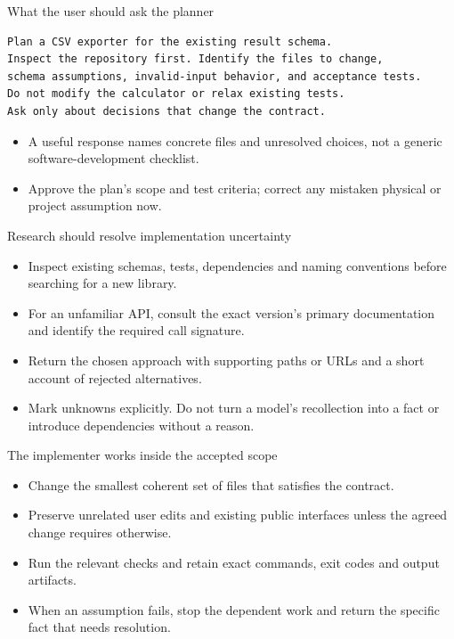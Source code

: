 \documentclass[aspectratio=169,11pt]{beamer}
\begin{document}
\begin{frame}[t,fragile]{What the user should ask the planner}
\begin{lstlisting}
Plan a CSV exporter for the existing result schema.
Inspect the repository first. Identify the files to change,
schema assumptions, invalid-input behavior, and acceptance tests.
Do not modify the calculator or relax existing tests.
Ask only about decisions that change the contract.
\end{lstlisting}
\fontsize{10.5}{12.5}\selectfont
\begin{itemize}\setlength{\itemsep}{2mm}
\item A useful response names concrete files and unresolved choices, not a generic software-development checklist.
\item Approve the plan's scope and test criteria; correct any mistaken physical or project assumption now.
\end{itemize}
\end{frame}
\begin{frame}[t,fragile]{Research should resolve implementation uncertainty}
\fontsize{11.5}{14}\selectfont
\begin{itemize}\setlength{\itemsep}{2mm}
\item Inspect existing schemas, tests, dependencies and naming conventions before searching for a new library.
\item For an unfamiliar API, consult the exact version's primary documentation and identify the required call signature.
\item Return the chosen approach with supporting paths or URLs and a short account of rejected alternatives.
\item Mark unknowns explicitly. Do not turn a model's recollection into a fact or introduce dependencies without a reason.
\end{itemize}
\end{frame}
\begin{frame}[t,fragile]{The implementer works inside the accepted scope}
\fontsize{11.5}{14}\selectfont
\begin{itemize}\setlength{\itemsep}{2mm}
\item Change the smallest coherent set of files that satisfies the contract.
\item Preserve unrelated user edits and existing public interfaces unless the agreed change requires otherwise.
\item Run the relevant checks and retain exact commands, exit codes and output artifacts.
\item When an assumption fails, stop the dependent work and return the specific fact that needs resolution.
\end{itemize}
\end{frame}
\end{document}
